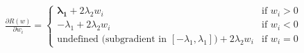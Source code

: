 \documentclass[preview]{standalone}
\begin{document}
\begin{align*}
\frac{\partial R(w)}{\partial w_i} =\begin{cases}\mathbf{\lambda_1} + 2\lambda_2 w_i & \text{if } w_i > 0 \\-\lambda_1 + 2\lambda_2 w_i & \text{if } w_i < 0 \\\text{undefined (subgradient in } [-\lambda_1, \lambda_1]) + 2\lambda_2 w_i & \text{if } w_i = 0\end{cases}
\end{align*}
\end{document}
